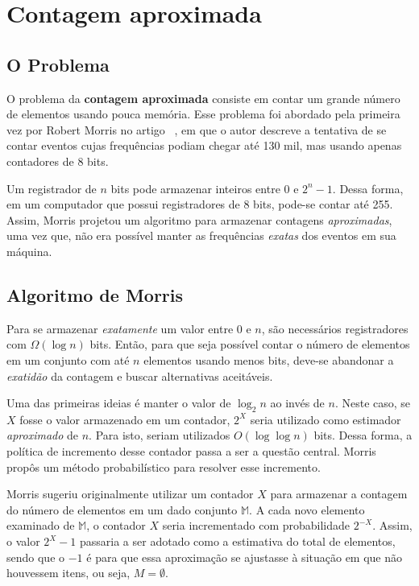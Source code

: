 \chapter{Contagem aproximada}
\label{chap:morris}


\section{O Problema}

O problema da \textbf{contagem aproximada} consiste em contar um grande número de elementos usando pouca memória.  
Esse problema foi abordado pela primeira vez por Robert  Morris no artigo ~\citep{morris:78}, 
em que o autor descreve a tentativa de se contar eventos cujas frequências podiam chegar até 130 mil, mas usando apenas contadores de 8 bits.

Um registrador de $n$ bits pode armazenar inteiros entre $0$ e $2^n-1$. Dessa forma, em um computador que possui registradores de 8 bits, pode-se contar até 255.
Assim, Morris projetou um algoritmo para armazenar contagens \textit{aproximadas}, uma vez que, não era possível manter as frequências \textit{exatas} dos eventos 
em sua máquina.


\section{Algoritmo de Morris}

Para se armazenar \textit{exatamente} um valor entre $0$ e $n$, são necessários registradores com $\Omega(\log n)$ bits. 
Então, para que seja possível contar o número de elementos em um conjunto com até $n$ elementos usando menos bits, 
deve-se abandonar a \textit{exatidão} da contagem e buscar alternativas aceitáveis.

Uma das primeiras ideias é manter o valor de $\log_2 n$ ao invés de $n$. 
Neste caso, se $X$ fosse o valor armazenado em um contador, $2^X$ seria utilizado como estimador \textit{aproximado} de $n$.
Para isto, seriam utilizados $O(\log \log n)$ bits.
Dessa forma, a política de incremento desse contador passa a ser a questão central.
Morris propôs um método probabilístico para resolver esse incremento.

Morris sugeriu originalmente utilizar um contador $X$ para armazenar a contagem do número de elementos em um dado conjunto $\mathbb{M}$.
A cada novo elemento examinado de $\mathbb{M}$, o contador $X$ seria incrementado com probabilidade $2^{-X}$.
Assim, o valor $2^{X} - 1$ passaria a ser adotado como a estimativa do total de elementos, 
sendo que o $-1$ é para que essa aproximação se ajustasse à situação em que não houvessem itens, ou seja, $M = \emptyset$.

